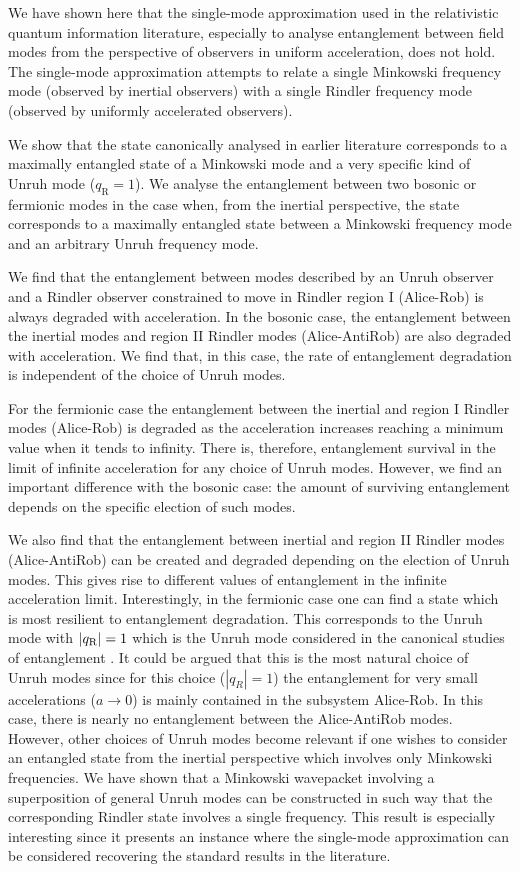 We have shown here that the single-mode approximation used in the relativistic quantum information literature, especially to analyse entanglement between field modes from the perspective of observers in uniform acceleration, does not hold. The single-mode approximation attempts to relate a single Minkowski frequency mode (observed by inertial observers) with a single Rindler frequency mode (observed by uniformly accelerated observers).

 We show that the state canonically analysed in earlier literature corresponds to a maximally entangled state of a Minkowski mode and a very specific kind of Unruh mode ($q_\text{R}=1$). We analyse the entanglement between two bosonic or fermionic modes in the case when, from the inertial perspective, the state corresponds to a maximally entangled state between a Minkowski frequency mode and an arbitrary Unruh frequency mode.
 
We find that the entanglement between modes described by an Unruh observer and a Rindler observer constrained to move in Rindler region I (Alice-Rob) is always degraded with acceleration.  In the bosonic case, the entanglement between the inertial modes  and region II Rindler  modes (Alice-AntiRob) are also degraded with acceleration.  We find that, in this case,  the rate of entanglement degradation is independent of the choice of Unruh modes.

 For the fermionic case the entanglement between the inertial and region I Rindler modes (Alice-Rob) is degraded as the acceleration increases reaching a minimum value when it tends to infinity. There is, therefore, entanglement survival in the limit of infinite acceleration for any choice of Unruh modes. However, we find an important difference with the bosonic case: the amount of surviving entanglement depends on the specific election of such modes.

We also find that the entanglement between inertial and region II Rindler modes (Alice-AntiRob) can be  created and degraded depending on the election of Unruh modes. This gives rise to different values of entanglement in the infinite acceleration limit.  Interestingly,  in the fermionic case one can find a state which is most resilient to entanglement degradation. This corresponds to the Unruh mode with  $|q_\text{\text{R}}|=1$ which is the Unruh mode considered in the canonical studies of entanglement \cite{Alsingtelep,Alicefalls,AlsingSchul,Edu2,Edu3,Edu4}. It  could be argued that this is the most natural choice of Unruh modes since for this choice ($|q_R|=1$) the entanglement for very small accelerations ($a\rightarrow0$) is mainly  contained in the subsystem Alice-Rob. In this case, there is nearly no entanglement between the Alice-AntiRob modes.  However, other choices of Unruh modes become relevant if one wishes to consider an entangled state from the inertial perspective which involves only Minkowski frequencies. We have shown that a Minkowski wavepacket involving a superposition of general Unruh modes can  be constructed in such way that the corresponding Rindler state involves a single frequency.  This result is especially interesting since it presents an instance where the single-mode approximation can be considered recovering the standard results in the literature. 